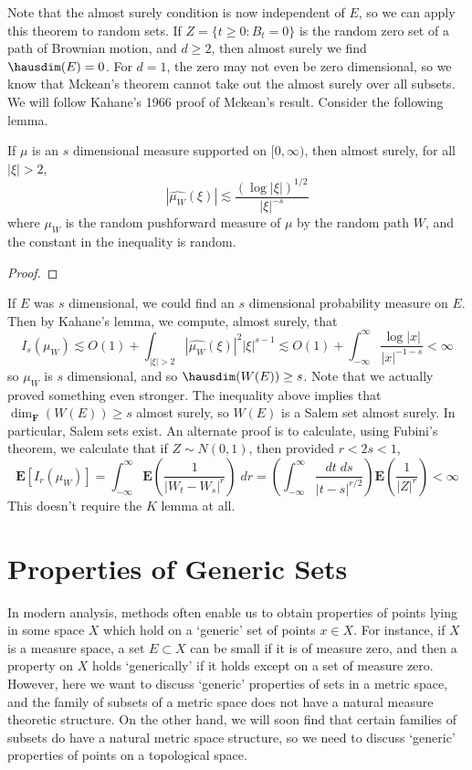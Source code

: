 Note that the almost surely condition is now independent of $E$, so we can apply this theorem to random sets. If $Z = \{ t \geq 0: B_t = 0 \}$ is the random zero set of a path of Brownian motion, and $d \geq 2$, then almost surely we find $\hausdim(E) = 0$. For $d = 1$, the zero may not even be zero dimensional, so we know that Mckean's theorem cannot take out the almost surely over all subsets. We will follow Kahane's 1966 proof of Mckean's result. Consider the following lemma.

\begin{lemma}
	If $\mu$ is an $s$ dimensional measure supported on $[0,\infty)$, then almost surely, for all $|\xi| > 2$,
	\[ |\widehat{\mu_W}(\xi)| \lesssim \frac{(\log |\xi|)^{1/2}}{|\xi|^{-s}} \]
	where $\mu_W$ is the random pushforward measure of $\mu$ by the random path $W$, and the constant in the inequality is random.
\end{lemma}
\begin{proof}
	
\end{proof}

If $E$ was $s$ dimensional, we could find an $s$ dimensional probability measure on $E$. Then by Kahane's lemma, we compute, almost surely, that
%
\[ I_s(\mu_W) \lesssim O(1) + \int_{|\xi| > 2} |\widehat{\mu_W}(\xi)|^2 |\xi|^{s-1} \lesssim O(1) + \int_{-\infty}^\infty \frac{\log |x|}{|x|^{-1-s}} < \infty \]
%
so $\mu_W$ is $s$ dimensional, and so $\hausdim(W(E)) \geq s$. Note that we actually proved something even stronger. The inequality above implies that $\dim_{\mathbf{F}}(W(E)) \geq s$ almost surely, so $W(E)$ is a Salem set almost surely. In particular, Salem sets exist. An alternate proof is to calculate, using Fubini's theorem, we calculate that if $Z \sim N(0,1)$, then provided $r < 2s < 1$,
	\[ \mathbf{E}[I_r(\mu_W)] = \int_{-\infty}^\infty \mathbf{E} \left( \frac{1}{|W_t - W_s|^r} \right)\; dr = \left( \int_{-\infty}^\infty \frac{dt\; ds}{|t-s|^{r/2}} \right) \mathbf{E} \left( \frac{1}{|Z|^r} \right) < \infty \]
	This doesn't require the $K$ lemma at all.

\chapter{Properties of Generic Sets}

In modern analysis, methods often enable us to obtain properties of points lying in some space $X$ which hold on a `generic' set of points $x \in X$. For instance, if $X$ is a measure space, a set $E \subset X$ can be small if it is of measure zero, and then a property on $X$ holds `generically' if it holds except on a set of measure zero. However, here we want to discuss `generic' properties of sets in a metric space, and the family of subsets of a metric space does not have a natural measure theoretic structure. On the other hand, we will soon find that certain families of subsets do have a natural metric space structure, so we need to discuss `generic' properties of points on a topological space.

